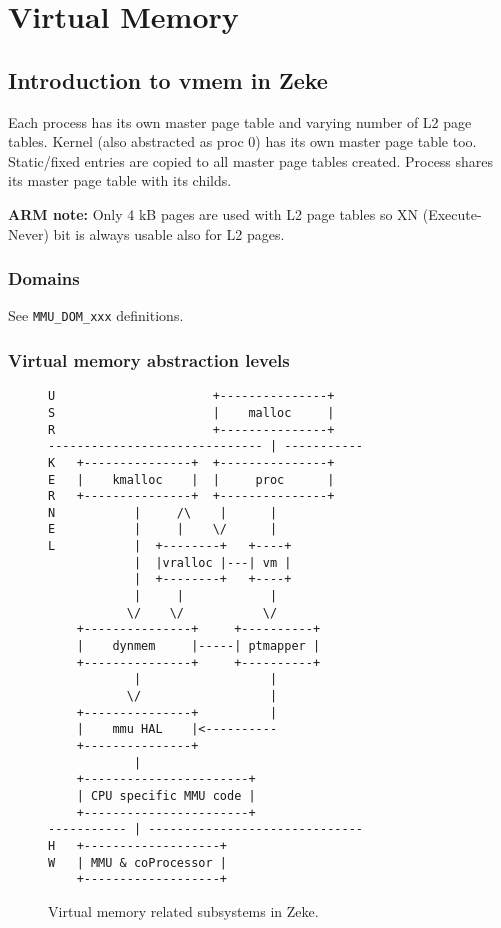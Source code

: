 \chapter{Virtual Memory}

\section{Introduction to vmem in Zeke}

Each process has its own master page table and varying number of L2 page
tables. Kernel (also abstracted as proc 0) has its own master page table
too. Static/fixed entries are copied to all master page tables created.
Process shares its master page table with its childs.

\textbf{ARM note:} Only 4 kB pages are used with L2 page tables so
XN (Execute-Never) bit is always usable also for L2 pages.

\subsection{Domains}

See \verb+MMU_DOM_xxx+ definitions.

\subsection{Virtual memory abstraction levels}

\begin{figure}
\begin{verbatim}
U                      +---------------+
S                      |    malloc     |
R                      +---------------+
------------------------------ | -----------
K   +---------------+  +---------------+
E   |    kmalloc    |  |     proc      |
R   +---------------+  +---------------+
N           |     /\    |      |
E           |     |    \/      |
L           |  +--------+   +----+
            |  |vralloc |---| vm |
            |  +--------+   +----+
            |     |            |
           \/    \/           \/
    +---------------+     +----------+
    |    dynmem     |-----| ptmapper |
    +---------------+     +----------+
            |                  |
           \/                  |
    +---------------+          |
    |    mmu HAL    |<----------
    +---------------+
            |
    +-----------------------+
    | CPU specific MMU code |
    +-----------------------+
----------- | ------------------------------
H   +-------------------+
W   | MMU & coProcessor |
    +-------------------+
\end{verbatim}
\caption{Virtual memory related subsystems in Zeke.}
\label{figure:vmsubsys}
\end{figure}

